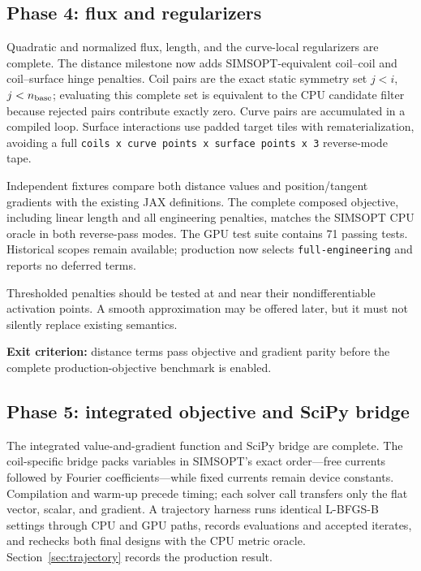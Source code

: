 \documentclass[11pt,a4paper]{article}
\newcommand{\code}[1]{\texttt{#1}}
\begin{document}
\subsection{Phase 4: flux and regularizers}

Quadratic and normalized flux, length, and the curve-local regularizers are
complete.  The distance milestone now adds SIMSOPT-equivalent coil--coil and
coil--surface hinge penalties.  Coil pairs are the exact static symmetry set
$j<i$, $j<n_{\rm base}$; evaluating this complete set is equivalent to the CPU
candidate filter because rejected pairs contribute exactly zero.  Curve pairs
are accumulated in a compiled loop.  Surface interactions use padded target
tiles with rematerialization, avoiding a full
\code{coils x curve points x surface points x 3} reverse-mode tape.

Independent fixtures compare both distance values and position/tangent
gradients with the existing JAX definitions.  The complete composed objective,
including linear length and all engineering penalties, matches the SIMSOPT CPU
oracle in both reverse-pass modes.  The GPU test suite contains 71 passing
tests.  Historical scopes remain available; production now selects
\code{full-engineering} and reports no deferred terms.

Thresholded penalties should be tested at and near their nondifferentiable
activation points.  A smooth approximation may be offered later, but it must
not silently replace existing semantics.

\textbf{Exit criterion:} distance terms pass objective and gradient parity
before the complete production-objective benchmark is enabled.

\subsection{Phase 5: integrated objective and SciPy bridge}

The integrated value-and-gradient function and SciPy bridge are complete.  The
coil-specific bridge packs variables in SIMSOPT's exact
order---free currents followed by Fourier coefficients---while fixed currents
remain device constants.  Compilation and warm-up precede timing; each solver
call transfers only the flat vector, scalar, and gradient.  A trajectory harness
runs identical L-BFGS-B settings through CPU and GPU paths, records evaluations
and accepted iterates, and rechecks both final designs with the CPU metric
oracle.  Section~\ref{sec:trajectory} records the production result.
\end{document}
